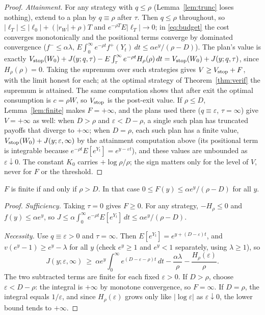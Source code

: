 \begin{proof}
\emph{Attainment.} For any strategy with $q\le\rho$ (Lemma~\ref{lem:trunc} loses nothing), extend to a plan by $q\equiv\rho$ after $\tau$. Then $q\le\rho$ throughout, so $|\ell_T|\le|\ell_0|+(|r_W|+\rho)T$ and $e^{-\rho T}E|\ell_T|\to0$; in \eqref{eq:budget} the cost converges monotonically and the positional terms converge by dominated convergence ($f^-\le\alpha\lambda$, $E\int_0^\infty e^{-\rho t}f^+(Y_t)\,dt\le\alpha e^y/(\rho-D)$). The plan's value is exactly $V_{\rm stop}(W_0)+J(y;q,\tau)-E\int_\tau^\infty e^{-\rho t}H_\rho(\rho)\,dt=V_{\rm stop}(W_0)+J(y;q,\tau)$, since $H_\rho(\rho)=0$. Taking the supremum over such strategies gives $V\ge V_{\rm stop}+F$, with the limit honest for each; at the optimal strategy of Theorem~\ref{thm:verif} the supremum is attained. The same computation shows that after exit the optimal consumption is $c=\rho W$, so $V_{\rm stop}$ is the post-exit value. If $\rho\le D$, Lemma~\ref{lem:finite} makes $F=+\infty$, and the plans used there ($q\equiv\varepsilon$, $\tau=\infty$) give $V=+\infty$ as well: when $D>\rho$ and $\varepsilon<D-\rho$, a single such plan has truncated payoffs that diverge to $+\infty$; when $D=\rho$, each such plan has a finite value, $V_{\rm stop}(W_0)+J(y;\varepsilon,\infty)$ by the attainment computation above (its positional term is integrable because $e^{-\rho t}E[e^{Y_t}]=e^{y-\varepsilon t}$), and these values are unbounded as $\varepsilon\downarrow0$. The constant $K_0$ carries $+\log\rho/\rho$; the sign matters only for the level of $V$, never for $F$ or the threshold.
\end{proof}

\begin{alemma}[Finiteness]\label{lem:finite}
$F$ is finite if and only if $\rho>D$. In that case $0\le F(y)\le \alpha e^y/(\rho-D)$ for all $y$.
\end{alemma}

\begin{proof}
\emph{Sufficiency.} Taking $\tau=0$ gives $F\ge0$. For any strategy, $-H_\rho\le0$ and $f(y)\le\alpha e^y$, so $J\le\alpha\int_0^\infty e^{-\rho t}E[e^{Y_t}]\,dt\le\alpha e^y/(\rho-D)$.

\emph{Necessity.} Use $q\equiv\varepsilon>0$ and $\tau=\infty$. Then $E[e^{Y_t}]=e^{y+(D-\varepsilon)t}$, and $v(e^y-1)\ge e^y-\lambda$ for all $y$ (check $e^y\ge1$ and $e^y<1$ separately, using $\lambda\ge1$), so
\[
J(y;\varepsilon,\infty)\ \ge\ \alpha e^y\int_0^\infty e^{(D-\varepsilon-\rho)t}\,dt-\frac{\alpha\lambda}{\rho}-\frac{H_\rho(\varepsilon)}{\rho}.
\]
The two subtracted terms are finite for each fixed $\varepsilon>0$. If $D>\rho$, choose $\varepsilon<D-\rho$: the integral is $+\infty$ by monotone convergence, so $F=\infty$. If $D=\rho$, the integral equals $1/\varepsilon$, and since $H_\rho(\varepsilon)$ grows only like $|\log\varepsilon|$ as $\varepsilon\downarrow0$, the lower bound tends to $+\infty$.
\end{proof}


